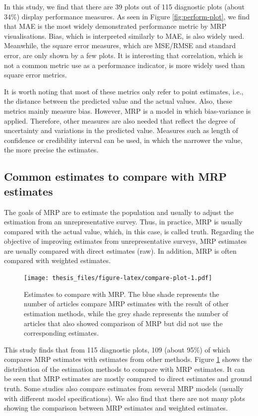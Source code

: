 \documentclass{monashthesis}
\begin{document}
In this study, we find that there are 39 plots out of 115 diagnostic plots (about 34\%) display performance measures. As seen in Figure \ref{fig:perform-plot}, we find that MAE is the most widely demonstrated performance metric by MRP visualisations. Bias, which is interpreted similarly to MAE, is also widely used. Meanwhile, the square error measures, which are MSE/RMSE and standard error, are only shown by a few plots. It is interesting that correlation, which is not a common metric use as a performance indicator, is more widely used than square error metrics.

It is worth noting that most of these metrics only refer to point estimates, i.e., the distance between the predicted value and the actual values. Also, these metrics mainly measure bias. However, MRP is a model in which bias-variance is applied. Therefore, other measures are also needed that reflect the degree of uncertainty and variations in the predicted value. Measures such as length of confidence or credibility interval can be used, in which the narrower the value, the more precise the estimates.

\hypertarget{common-estimates-to-compare-with-mrp-estimates}{%
\subsection{Common estimates to compare with MRP estimates}\label{common-estimates-to-compare-with-mrp-estimates}}

The goals of MRP are to estimate the population and usually to adjust the estimation from an unrepresentative survey. Thus, in practice, MRP is usually compared with the actual value, which, in this case, is called truth. Regarding the objective of improving estimates from unrepresentative surveys, MRP estimates are usually compared with direct estimates (raw). In addition, MRP is often compared with weighted estimates.

\begin{figure}
\centering
\texttt{[image: thesis\_files/figure-latex/compare-plot-1.pdf]}
\caption{\label{fig:compare-plot}Estimates to compare with MRP. The blue shade represents the number of articles compare MRP estimates with the result of other estimation methods, while the grey shade represents the number of articles that also showed comparison of MRP but did not use the corresponding estimates.}
\end{figure}

This study finds that from 115 diagnostic plots, 109 (about 95\%) of which compares MRP estimates with estimates from other methods. Figure \ref{fig:compare-plot} shows the distribution of the estimation methods to compare with MRP estimates. It can be seen that MRP estimates are mostly compared to direct estimates and ground truth. Some studies also compare estimates from several MRP models (usually with different model specifications). We also find that there are not many plots showing the comparison between MRP estimates and weighted estimates.
\end{document}
